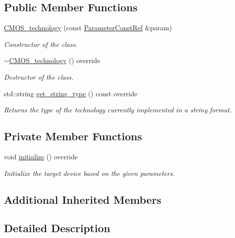 \subsection*{Public Member Functions}
\begin{DoxyCompactItemize}
\item 
\hyperlink{classCMOS__technology_a006a80a23d6486f8d35c5b0113044ee7}{C\+M\+O\+S\+\_\+technology} (const \hyperlink{Parameter_8hpp_a37841774a6fcb479b597fdf8955eb4ea}{Parameter\+Const\+Ref} \&param)
\begin{DoxyCompactList}\small\item\em Constructor of the class. \end{DoxyCompactList}\item 
\hyperlink{classCMOS__technology_aac71ba52c2e5fd3a0883366b603fc375}{$\sim$\+C\+M\+O\+S\+\_\+technology} () override
\begin{DoxyCompactList}\small\item\em Destructor of the class. \end{DoxyCompactList}\item 
std\+::string \hyperlink{classCMOS__technology_a068946d67529fe475c1943b0450c4110}{get\+\_\+string\+\_\+type} () const override
\begin{DoxyCompactList}\small\item\em Returns the type of the technology currently implemented in a string format. \end{DoxyCompactList}\end{DoxyCompactItemize}
\subsection*{Private Member Functions}
\begin{DoxyCompactItemize}
\item 
void \hyperlink{classCMOS__technology_af6aed0f6dc8bf72c8914a14c00b949a7}{initialize} () override
\begin{DoxyCompactList}\small\item\em Initialize the target device based on the given parameters. \end{DoxyCompactList}\end{DoxyCompactItemize}
\subsection*{Additional Inherited Members}


\subsection{Detailed Description}


